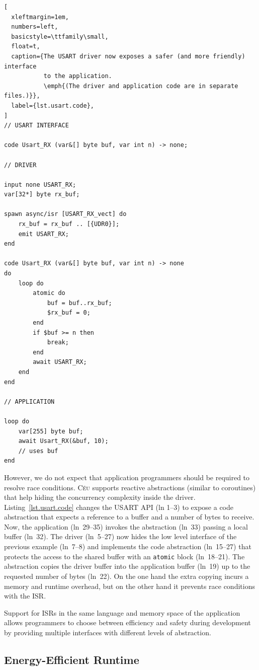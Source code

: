 \documentclass[sigplan,10pt,review,anonymous]{acmart}\settopmatter{printfolios=true,printccs=false,printacmref=false}
\newcommand{\CEU}{\textsc{C\'{e}u}\xspace}
\newcommand{\code}[1] {{\small{\texttt{#1}}}}
\begin{document}
\begin{lstlisting}[
  xleftmargin=1em,
  numbers=left,
  basicstyle=\ttfamily\small,
  float=t,
  caption={The USART driver now exposes a safer (and more friendly) interface
           to the application.
           \emph{(The driver and application code are in separate files.)}},
  label={lst.usart.code},
]
// USART INTERFACE

code Usart_RX (var&[] byte buf, var int n) -> none;

// DRIVER

input none USART_RX;
var[32*] byte rx_buf;

spawn async/isr [USART_RX_vect] do
    rx_buf = rx_buf .. [{UDR0}];
    emit USART_RX;
end

code Usart_RX (var&[] byte buf, var int n) -> none
do
    loop do
        atomic do
            buf = buf..rx_buf;
            $rx_buf = 0;
        end
        if $buf >= n then
            break;
        end
        await USART_RX;
    end
end

// APPLICATION

loop do
    var[255] byte buf;
    await Usart_RX(&buf, 10);
    // uses buf
end
\end{lstlisting}

However, we do not expect that application programmers should be required to
resolve race conditions.
\CEU supports reactive abstractions (similar to coroutines) that help hiding
the concurrency complexity inside the driver.
%
Listing~\ref{lst.usart.code} changes the USART API (ln 1--3) to expose a code
abstraction that expects a reference to a buffer and a number of bytes to
receive.
Now, the application (ln~29--35) invokes the abstraction (ln~33) passing a
local buffer (ln~32).
%
The driver (ln~5--27) now hides the low level interface of the previous example
(ln~7--8) and implements the code abstraction (ln~15--27) that protects the
access to the shared buffer with an \code{atomic} block (ln~18--21).
%
The abstraction copies the driver buffer into the application buffer (ln~19)
up to the requested number of bytes (ln~22).
%
On the one hand the extra copying incurs a memory and runtime overhead, but on
the other hand it prevents race conditions with the ISR.

Support for ISRs in the same language and memory space of the application
allows programmers to choose between efficiency and safety during development
by providing multiple interfaces with different levels of abstraction.

\subsection{Energy-Efficient Runtime}
\label{sec.energy}
\end{document}
